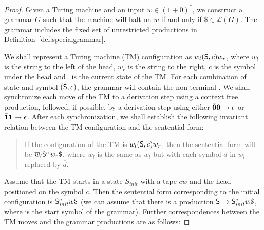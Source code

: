 \documentclass[9pt,preprint,nonatbib]{sigplanconf}
\begin{document}
\begin{proof}
Given a Turing machine and  an input $w\in (1+0)^*$, we
construct a grammar $G$ such that the machine will halt
on    $w$    if    and   only    if    $\$    \in
\mathscr{L}(G)$. The grammar includes  the fixed set of
unrestricted               productions               in
Definition~\ref{def:specialgrammar}.

We shall represent a Turing machine (TM) configuration 
as $w_l(\mathsf{S},c)w_r$, where $w_l$ is the string to the
left of the head, $w_r$ is the string to the right, $c$
is the symbol under the head and \state\ is the current
state of  the TM.   For each combination  of state
and symbol  $(\mathsf{S},c)$, the grammar will  contain the
non-terminal . We shall synchronize each move
of the TM to  a derivation  step using  a context
free production, followed, if possible, by a derivation
step using either  $\bar{\mathbf{0}}\mathbf{0} \rightarrow \epsilon$ or
$\bar{\mathbf{1}}\mathbf{1}   \rightarrow    \epsilon$.    After   each
synchronization,  we  shall   establish  the  following
invariant  relation between  the TM  configuration
and the sentential form:

\begin{quote}
  If    the   configuration    of   the    TM   is
  $w_l(\mathsf{S},c)w_r$, then the  sentential form will be
  $\overline{w}_l\nont{}{c}\,w_r\$ $,                where
  $\overline{w}_l$ is  the same as $w_l$  but with each
  symbol $d$ in $w_l$ replaced by $\overline{d}$.
\end{quote}

Assume that  the TM starts  in a  state $S_\mathit{init}$ with  a tape
$cw$ and  the head positioned on  the symbol $c$. Then  the sentential
form    corresponding     to    the    initial     configuration    is
$\nont{\mathit{init}}{c}w\$$ (we  can assume that there  is a production
$\nont{}{} \rightarrow  \nont{\mathit{init}}{c}w\$$, where  \nont{}{} is
the start symbol of the  grammar). Further correspondences between the
TM moves and the grammar productions are as follows:


\end{proof}
\end{document}
